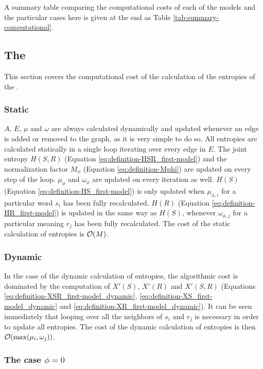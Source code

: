 A summary table comparing the computational costs of each of the models and the particular cases here is given at the end as Table \ref{tab:summary-computational}.

\subsection{The \firstmodel{}}
\label{sec:model_compute_first-model}

This section covers the computational cost of the calculation of the entropies of the \firstmodel{}.

\subsubsection{Static}

$A$, $E$, $\mu$ and $\omega$ are always calculated dynamically and updated whenever an edge is added or removed to the graph, as it is very simple to do so.
All entropies are calculated statically in a single loop iterating over every edge in $E$.
The joint entropy $H(S,R)$ (Equation \eqref{eq:definition-HSR_first-model}) and the normalization factor $M_\phi$ (Equation \eqref{eq:definition-Mphi}) are updated on every step of the loop.
$\mu_\phi$ and $\omega_\phi$ are updated on every iteration as well.
$H(S)$ (Equation \eqref{eq:definition-HS_first-model}) is only updated when $\mu_{\phi,i}$ for a particular word $s_i$ has been fully recalculated.
$H(R)$ (Equation \eqref{eq:definition-HR_first-model}) is updated in the same way as $H(S)$, whenever $\omega_{\phi,j}$ for a particular meaning $r_j$ has been fully recalculated.
The cost of the static calculation of entropies is $\mathcal{O}(M)$.

\subsubsection{Dynamic}

In the case of the dynamic calculation of entropies, the algorithmic cost is dominated by the computation of $X'(S)$, $X'(R)$ and $X'(S,R)$ (Equations \eqref{eq:definition-XSR_first-model_dynamic}, \eqref{eq:definition-XS_first-model_dynamic} and \eqref{eq:definition-XR_first-model_dynamic}).
It can be seen immediately that looping over all the neighbors of $s_i$ and $r_j$ is necessary in order to update all entropies.
The cost of the dynamic calculation of entropies is then $\mathcal{O}(\max(\mu_i,\omega_j))$.

\subsubsection{The case $\phi=0$}

